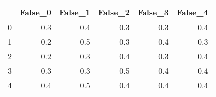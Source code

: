\begin{tabular}{lrrrrr}
\toprule
{} &  False\_0 &  False\_1 &  False\_2 &  False\_3 &  False\_4 \\ \hline
\midrule
0 &      0.3 &      0.4 &      0.3 &      0.3 &      0.4 \\ \hline
1 &      0.2 &      0.5 &      0.3 &      0.4 &      0.3 \\ \hline
2 &      0.2 &      0.3 &      0.4 &      0.3 &      0.4 \\ \hline
3 &      0.3 &      0.3 &      0.5 &      0.4 &      0.4 \\ \hline
4 &      0.4 &      0.5 &      0.4 &      0.4 &      0.4 \\ \hline
\bottomrule
\end{tabular}

